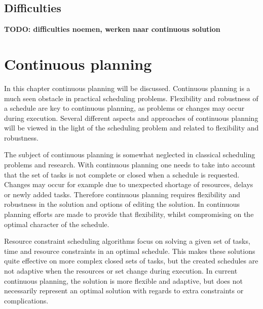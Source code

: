 \documentclass{article}
\newcommand{\TODO}[1]{{\color{red}\textbf{TODO: #1}}}
\begin{document}
\subsection{Difficulties}
\TODO{difficulties noemen, werken naar continuous solution}



\newpage

\section{Continuous planning}

In this chapter continuous planning will be discussed.
Continuous planning is a much seen obstacle in practical scheduling problems.
Flexibility and robustness of a schedule are key to continuous planning, as problems or changes may occur during execution.
Several different aspects and approaches of continuous planning will be viewed in the light of the scheduling problem and related to flexibility and robustness.

The subject of continuous planning is somewhat neglected in classical scheduling problems and research.
With continuous planning one needs to take into account that the set of tasks is not complete or closed when a schedule is requested.
Changes may occur for example due to unexpected shortage of resources, delays or newly added tasks.
Therefore continuous planning requires flexibility and robustness in the solution and options of editing the solution.
In continuous planning efforts are made to provide that flexibility, whilst compromising on the optimal character of the schedule.

Resource constraint scheduling algorithms focus on solving a given set of tasks, time and resource constraints in an optimal schedule.
This makes these solutions quite effective on more complex closed sets of tasks, but the created schedules are not adaptive when the resources or set change during execution.
In current continuous planning, the solution is more flexible and adaptive, but does not necessarily represent an optimal solution with regards to extra constraints or complications.
\cite{laborie03}
\end{document}

